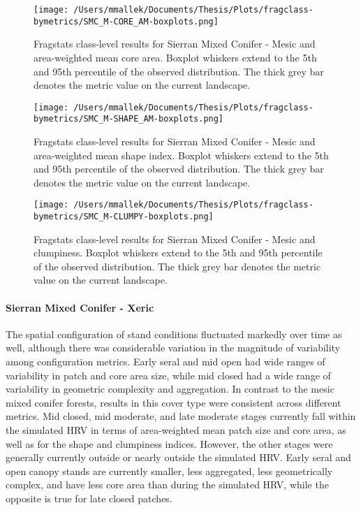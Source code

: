 \begin{figure}[!htbp]
\centering
    \texttt{[image: /Users/mmallek/Documents/Thesis/Plots/fragclass-bymetrics/SMC\_M-CORE\_AM-boxplots.png]}
  \caption{Fragstats class-level results for Sierran Mixed Conifer - Mesic and area-weighted mean core area. Boxplot whiskers extend to the 5th and 95th percentile of the observed distribution. The thick grey bar denotes the metric value on the current landscape.}
  \label{fig:smcm_coream}
\end{figure}


\begin{figure}[!htbp]
\centering
    \texttt{[image: /Users/mmallek/Documents/Thesis/Plots/fragclass-bymetrics/SMC\_M-SHAPE\_AM-boxplots.png]}
  \caption{Fragstats class-level results for Sierran Mixed Conifer - Mesic and area-weighted mean shape index. Boxplot whiskers extend to the 5th and 95th percentile of the observed distribution. The thick grey bar denotes the metric value on the current landscape.}
  \label{fig:smcm_shapeam}
\end{figure}


\begin{figure}[!htbp]
\centering
    \texttt{[image: /Users/mmallek/Documents/Thesis/Plots/fragclass-bymetrics/SMC\_M-CLUMPY-boxplots.png]}
  \caption{Fragstats class-level results for Sierran Mixed Conifer - Mesic and clumpiness. Boxplot whiskers extend to the 5th and 95th percentile of the observed distribution. The thick grey bar denotes the metric value on the current landscape.}
  \label{fig:smcm_clumpy}
\end{figure}

\clearpage


\paragraph{Sierran Mixed Conifer - Xeric}
The spatial configuration of stand conditions fluctuated markedly over time as well, although there was considerable variation in the magnitude of variability among configuration metrics. Early seral and mid open had wide ranges of variability in patch and core area size, while mid closed had a wide range of variability in geometric complexity and aggregation. In contrast to the mesic mixed conifer forests, results in this cover type were consistent across different metrics. Mid closed, mid moderate, and late moderate stages currently fall within the simulated HRV in terms of area-weighted mean patch size and core area, as well as for the shape and clumpiness indices. However, the other stages were generally currently outside or nearly outside the simulated HRV. Early seral and open canopy stands are currently smaller, less aggregated, less geometrically complex, and have less core area than during the simulated HRV, while the opposite is true for late closed patches.


